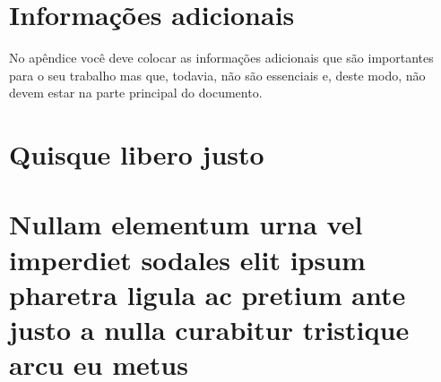\chapter{Informações adicionais}

No apêndice você deve colocar as informações adicionais que
são importantes para o seu trabalho mas que, todavia, não são
essenciais e, deste modo, não devem estar na parte principal do documento.

\chapter{Quisque libero justo}

\lipsum[50]

\chapter{Nullam elementum urna vel imperdiet sodales elit ipsum pharetra ligula
	ac pretium ante justo a nulla curabitur tristique arcu eu metus}
\lipsum[55-57]